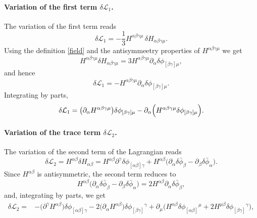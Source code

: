 \documentclass[a4paper,12pt]{article}
\begin{document}
\paragraph{Variation of the first term $\delta \mathcal{L}_1$.}
The variation of the first term reads
\begin{equation}
\delta\mathcal L_1
=-\frac{1}{3}H^{\alpha\beta\gamma\mu}\,
\delta H_{\alpha\beta\gamma\mu}.
\end{equation}
Using the definition \eqref{field} and the antisymmeetry properties of $H^{\alpha\beta\gamma\mu}$ we get
\begin{equation}
H^{\alpha\beta\gamma\mu}\delta H_{\alpha\beta\gamma\mu}
=3H^{\alpha\beta\gamma\mu}\partial_{\alpha}
\delta\phi_{[\beta\gamma]\mu},
\end{equation}
and hence
\begin{equation}
\delta\mathcal L_1
=-H^{\alpha\beta\gamma\mu}\partial_{\alpha}
\delta\phi_{[\beta\gamma]\mu}.
\end{equation}
Integrating by parts,
\begin{equation}
\delta\mathcal L_1
=
\bigl(\partial_{\alpha}H^{\alpha\beta\gamma\mu}\bigr)
\delta\phi_{[\beta\gamma]\mu}
-\partial_{\alpha}\Bigl(
H^{\alpha\beta\gamma\mu}\delta\phi_{[\beta\gamma]\mu}
\Bigr).
\end{equation}

\paragraph{Variation of the trace term $\delta \mathcal{L}_2$.}
The variation of the second term of the Lagrangian reads
\begin{equation}
\delta\mathcal L_2
=H^{\alpha\beta}\delta H_{\alpha\beta}
=H^{\alpha\beta}\partial^{\gamma}\delta\phi_{[\alpha\beta]\gamma}
+H^{\alpha\beta}
\bigl(\partial_{\alpha}\delta\bar\phi_{\beta}
-\partial_{\beta}\delta\bar\phi_{\alpha}\bigr).
\end{equation}
Since $H^{\alpha\beta}$ is antisymmetric, the second term reduces to
\begin{equation}
H^{\alpha\beta}
\bigl(\partial_{\alpha}\delta\bar\phi_{\beta}
-\partial_{\beta}\delta\bar\phi_{\alpha}\bigr)
=2H^{\alpha\beta}\partial_{\alpha}\delta\bar\phi_{\beta},
\end{equation}
and, integrating by parts, we get
\begin{align}
\delta\mathcal L_2
={}&
-\bigl(\partial^{\gamma}H^{\alpha\beta}\bigr)
\delta\phi_{[\alpha\beta]\gamma}
-2\bigl(\partial_{\alpha}H^{\alpha\beta}\bigr)
\delta\phi_{[\beta\gamma]}{}^{\gamma}
+\partial_{\mu}\big(H^{\alpha\beta}\delta\phi_{[\alpha\beta]}{}^{\mu}
+2H^{\mu\beta}\delta\phi_{[\beta\gamma]}{}^{\gamma}\big),
\end{align}
\end{document}
